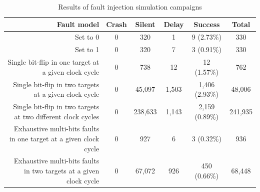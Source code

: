 \begin{table}
    \centering
    \small
    \caption{Results of fault injection simulation campaigns}
    \label{table:end_sim_by_status}
    \setlength{\tabcolsep}{3pt}
    \begin{tabular}{@{}rccccc@{}}
        \toprule
                                                                          Fault model  & Crash & Silent    & Delay & Success           & Total     \\
        \midrule
        Set to 0                                                            & 0     & 320       & 1     & 9 (2.73\%)        & 330       \\
        Set to 1                                                            & 0     & 320       & 7     & 3 (0.91\%)        & 330       \\
        Single bit-flip in one target at a given clock cycle                & 0     & 738       & 12    & 12 (1.57\%)       & 762       \\
        Single bit-flip in two targets at a given clock cycle               & 0     & 45,097    & 1,503 & 1,406 (2.93\%)    & 48,006    \\
        Single bit-flip in two targets at two different clock cycles        & 0     & 238,633   & 1,143 & 2,159 (0.89\%)    & 241,935   \\
        Exhaustive multi-bits faults in one target at a given clock cycle   & 0     & 927       & 6     & 3 (0.32\%)        & 936       \\
        Exhaustive multi-bits faults in two targets at a given clock cycle  & 0     & 67,072    & 926   & 450 (0.66\%)      & 68,448    \\
        \bottomrule
    \end{tabular}
\end{table}

